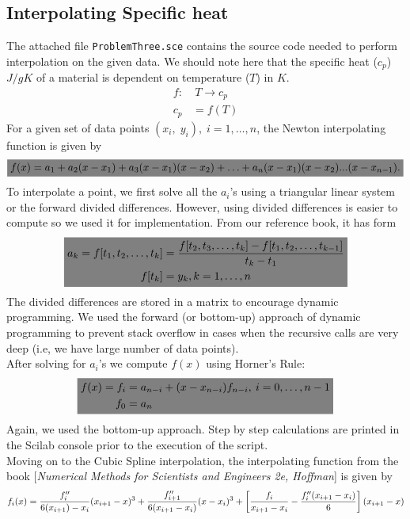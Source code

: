\documentclass[a4paper]{article}
\newcommand{\highlight}[1]{\colorbox{gray}{$\displaystyle#1$}}
\begin{document}
		\subsection{Interpolating Specific heat}
			The attached file \texttt{ProblemThree.sce} contains the source code needed to perform interpolation on the given data.
			We should note here that the specific heat ($c_p$) $J/gK$ of a material is dependent on temperature ($T$) in $K$.
			$$
			\begin{aligned}
				f:&\:T\rightarrow c_p \\ c_p &= f(T)
			\end{aligned}
			$$
			For a given set of data points $(x_i,\;y_i),\;i=1,\ldots,n$, the Newton interpolating function is given by
			$$\highlight{
				f(x) = a_1 + a_2(x-x_1) + a_3(x-x_1)(x-x_2) + \ldots + a_n(x-x_1)(x-x_2)...(x-x_{n-1}).
			}$$
			To interpolate a point, we first solve all the $a_i$'s using a triangular linear system or the forward divided differences.
			However, using divided differences is easier to compute so we used it for implementation. From our reference book, it has form
			$$\highlight{
			\begin{aligned}
				a_k = f[t_1,t_2,\ldots,t_k] &= \frac{f[t_2,t_3,\ldots,t_k]-f[t_1,t_2,\ldots,t_{k-1}]}{t_k-t_1}\\
				f[t_k] &= y_k, k=1,\ldots,n
			\end{aligned}
			}$$
			The divided differences are stored in a matrix to encourage dynamic programming.
			We used the forward (or bottom-up) approach of dynamic programming to prevent stack overflow in cases when the recursive calls are very deep (i.e, we have large number of data points).
			\\
			After solving for $a_i$'s we compute $f(x)$ using Horner's Rule:
			$$\highlight{
			\begin{aligned}
				f(x) = f_i &= a_{n-i} + (x-x_{n-i})f_{n-i},\:i=0,\ldots,n-1\\
				f_0 &= a_n
			\end{aligned}
			}$$
			Again, we used the bottom-up approach. Step by step calculations are printed in the Scilab console prior to the execution of the script.
			\\
			Moving on to the Cubic Spline interpolation, the interpolating function from the book [\textit{Numerical Methods for Scientists and Engineers 2e, Hoffman}] is given by
			$$
				f_i(x) = \frac{f''_i}{6(x_{i+1})-x_i}(x_{i+1}-x)^3 + \frac{f''_{i+1}}{6(x_{i+1}-x_i)}(x-x_i)^3 \\
				+ \left[\frac{f_i}{x_{i+1}-x_i}-\frac{f''_i(x_{i+1}-x_i)}{6}\right](x_{i+1}-x) \\
			$$
\end{document}
